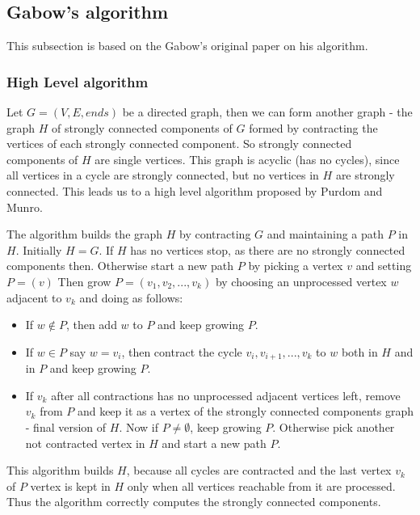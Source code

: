 \documentclass{report}
\theoremstyle{plain}
\theoremstyle{definition}
\theoremstyle{remark}
\numberwithin{definition}{chapter}
\numberwithin{example}{chapter}
\numberwithin{figure}{chapter}
\numberwithin{theorem}{chapter}
\numberwithin{lemma}{chapter}
\begin{document}
\subsection{Gabow's algorithm}

This subsection is based on the Gabow's original paper \cite{Gabow2000107} on his algorithm.

\subsubsection*{High Level algorithm}

Let $G=(V, E, ends)$ be a directed graph, then we can form another graph - the graph $H$ of strongly connected components of $G$ formed by contracting the vertices of each strongly connected component. So strongly connected components of $H$ are single vertices. This graph is acyclic (has no cycles), since all vertices in a cycle are strongly connected, but no vertices in $H$ are strongly connected. This leads us to a high level algorithm proposed by Purdom and Munro.

The algorithm builds the graph $H$ by contracting $G$ and maintaining a path $P$ in $H$. Initially $H=G$. If $H$ has no vertices stop, as there are no strongly connected components then. Otherwise start a new path $P$ by picking a vertex $v$ and setting $P = (v)$ Then grow $P=(v_1,v_2,...,v_k)$ by choosing an unprocessed vertex $w$ adjacent to $v_k$ and doing as follows:

\begin{itemize}
  \item If $w \not \in P$, then add $w$ to $P$ and keep growing $P$.
  \item If $w \in P$ say $w=v_i$, then contract the cycle $v_i,v_{i+1},...,v_k$ to $w$ both in $H$ and in $P$ and keep growing $P$.
  \item If $v_k$ after all contractions has no unprocessed adjacent vertices left, remove $v_k$ from $P$ and keep it as a vertex of the strongly connected components graph - final version of $H$. Now if $P \not = \emptyset$, keep growing $P$. Otherwise pick another not contracted vertex in $H$ and start a new path $P$.
\end{itemize}

This algorithm builds $H$, because all cycles are contracted and the last vertex $v_k$ of $P$ vertex is kept in $H$ only when all vertices reachable from it are processed. Thus the algorithm correctly computes the strongly connected components.
\end{document}

